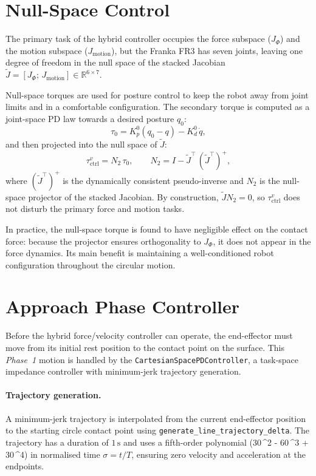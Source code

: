 \documentclass[
	german,%
	accentcolor=9c,%
	ruledheaders=section,%
	class=report,%
	thesis={type=bachelor},%
	fontsize=11pt,%
	parskip=half-,%
	custommargins=true,%
	marginpar=false,%
]{tudapub}
\begin{document}
\section{Null-Space Control}
\label{sec:null_space}

The primary task of the hybrid controller occupies the force subspace
(\(J_\Phi\)) and the motion subspace (\(J_\text{motion}\)), but the
Franka FR3 has seven joints, leaving one degree of freedom in the
null space of the stacked Jacobian
\(\tilde{J} = [J_\Phi;\, J_\text{motion}] \in \mathbb{R}^{6 \times 7}\).

Null-space torques are used for posture control to keep the robot
away from joint limits and in a comfortable configuration.
The secondary torque is computed as a joint-space PD law towards a
desired posture \(q_0\):
\begin{equation}
    \tau_0 = K_p^0 (q_0 - q) - K_d^0\,\dot{q},
\end{equation}
and then projected into the null space of \(\tilde{J}\):
\begin{equation}
    \tau_\text{ctrl}^v = N_2\,\tau_0,
    \qquad
    N_2 = I - \tilde{J}^\top\,(\tilde{J}^{\top})^+,
\end{equation}
where \((\tilde{J}^{\top})^+\) is the dynamically consistent pseudo-inverse
and \(N_2\) is the null-space projector of the stacked Jacobian.
By construction, \(\tilde{J} N_2 = 0\), so \(\tau_\text{ctrl}^v\) does
not disturb the primary force and motion tasks.

In practice, the null-space torque is found to have negligible effect on
the contact force: because the projector ensures orthogonality to
\(J_\Phi\), it does not appear in the force dynamics.
Its main benefit is maintaining a well-conditioned robot configuration
throughout the circular motion.


\section{Approach Phase Controller}
\label{sec:approach_ctrl}

Before the hybrid force/velocity controller can operate, the end-effector
must move from its initial rest position to the contact point on the surface.
This \emph{Phase~1} motion is handled by the \texttt{CartesianSpacePDController},
a task-space impedance controller with minimum-jerk trajectory generation.

\paragraph{Trajectory generation.}
A minimum-jerk trajectory is interpolated from the current end-effector
position to the starting circle contact point using
\texttt{generate\_line\_trajectory\_delta}.
The trajectory has a duration of \(1\,\mathrm{s}\) and uses a fifth-order
polynomial (30\,\sigma^2 - 60\,\sigma^3 + 30\,\sigma^4) in normalised time
\(\sigma = t/T\), ensuring zero velocity and acceleration at the endpoints.
\end{document}
